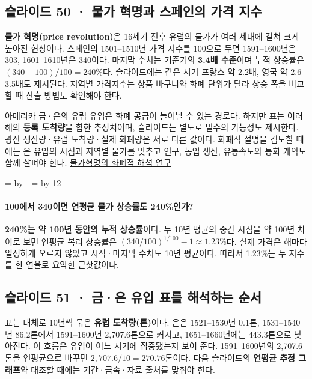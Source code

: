 \documentclass[10pt,a4paper]{article}
\newcommand{\ReserveQuestionSpace}{%
  \par\begingroup
  \dimen0=\pagegoal \advance\dimen0 by -\pagetotal
  \dimen2=\baselineskip \multiply\dimen2 by 12
  \ifdim\dimen0<\dimen2 \newpage\fi
  \endgroup}
\begin{document}
\subsection{슬라이드 50 · 물가 혁명과 스페인의 가격 지수}
\textbf{물가 혁명(price revolution)}은 16세기 전후 유럽의 물가가 여러 세대에 걸쳐 크게 높아진 현상이다. 스페인의 1501–1510년 가격 지수를 100으로 두면 1591–1600년은 303, 1601–1610년은 340이다. 마지막 수치는 기준기의 \textbf{3.4배 수준}이며 누적 상승률은 $(340-100)/100=240\%$다. 슬라이드에는 같은 시기 프랑스 약 2.2배, 영국 약 2.6–3.5배도 제시된다. 지역별 가격지수는 상품 바구니와 화폐 단위가 달라 상승 폭을 비교할 때 산출 방법도 확인해야 한다.\par

아메리카 금·은의 유럽 유입은 화폐 공급이 늘어날 수 있는 경로다. 하지만 표는 여러 해의 \textbf{등록 도착량}을 합한 추정치이며, 슬라이드는 별도로 밀수의 가능성도 제시한다. 광산 생산량·유럽 도착량·실제 화폐량은 서로 다른 값이다. 화폐적 설명을 검토할 때에는 은 유입의 시점과 지역별 물가를 맞추고 인구, 농업 생산, 유통속도와 통화 개악도 함께 살펴야 한다. \href{https://www.cambridge.org/core/journals/journal-of-economic-history/article/abs/price-revolution-a-monetary-interpretation/8544ABE09C0BECA7D4DE9FCDF1904875}{물가혁명의 화폐적 해석 연구}\par

\ReserveQuestionSpace
\paragraph{100에서 340이면 연평균 물가 상승률도 240\%인가?}
\textbf{240\%는 약 100년 동안의 누적 상승률}이다. 두 10년 평균의 중간 시점을 약 100년 차이로 보면 연평균 복리 상승률은 $(340/100)^{1/100}-1\approx1.23\%$다. 실제 가격은 해마다 일정하게 오르지 않았고 시작·마지막 수치도 10년 평균이다. 따라서 1.23\%는 두 지수를 한 연율로 요약한 근삿값이다.\par

\subsection{슬라이드 51 · 금·은 유입 표를 해석하는 순서}
표는 대체로 10년씩 묶은 \textbf{유럽 도착량(톤)}이다. 은은 1521–1530년 0.1톤, 1531–1540년 86.2톤에서 1591–1600년 2,707.6톤으로 커지고, 1651–1660년에는 443.3톤으로 낮아진다. 이 흐름은 유입이 어느 시기에 집중됐는지 보여 준다. 1591–1600년의 2,707.6톤을 연평균으로 바꾸면 $2{,}707.6/10=270.76$톤이다. 다음 슬라이드의 \textbf{연평균 추정 그래프}와 대조할 때에는 기간·금속·자료 출처를 맞춰야 한다.\par
\end{document}
